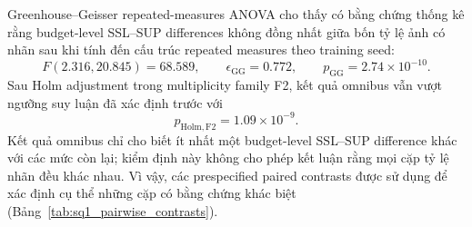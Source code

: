 \documentclass[pdflatex,sn-mathphys-num]{sn-jnl}%
\theoremstyle{thmstyleone}%
\theoremstyle{thmstyletwo}%
\theoremstyle{thmstylethree}%
\begin{document}
Greenhouse--Geisser repeated-measures ANOVA cho thấy có bằng chứng thống kê rằng budget-level SSL--SUP differences không đồng nhất giữa bốn tỷ lệ ảnh có nhãn sau khi tính đến cấu trúc repeated measures theo training seed:
\begin{equation}
F(2.316, 20.845)=68.589,\qquad
\epsilon_{\mathrm{GG}}=0.772,\qquad
p_{\mathrm{GG}}=2.74\times10^{-10}.
\label{eq:results_budget_gg_anova}
\end{equation}
Sau Holm adjustment trong multiplicity family F2, kết quả omnibus vẫn vượt ngưỡng suy luận đã xác định trước với
\begin{equation}
p_{\mathrm{Holm,F2}}=1.09\times10^{-9}.
\label{eq:results_budget_holm_f2}
\end{equation}
Kết quả omnibus chỉ cho biết ít nhất một budget-level SSL--SUP difference khác với các mức còn lại; kiểm định này không cho phép kết luận rằng mọi cặp tỷ lệ nhãn đều khác nhau. Vì vậy, các prespecified paired contrasts được sử dụng để xác định cụ thể những cặp có bằng chứng khác biệt (Bảng~\ref{tab:sq1_pairwise_contrasts}).
\end{document}

